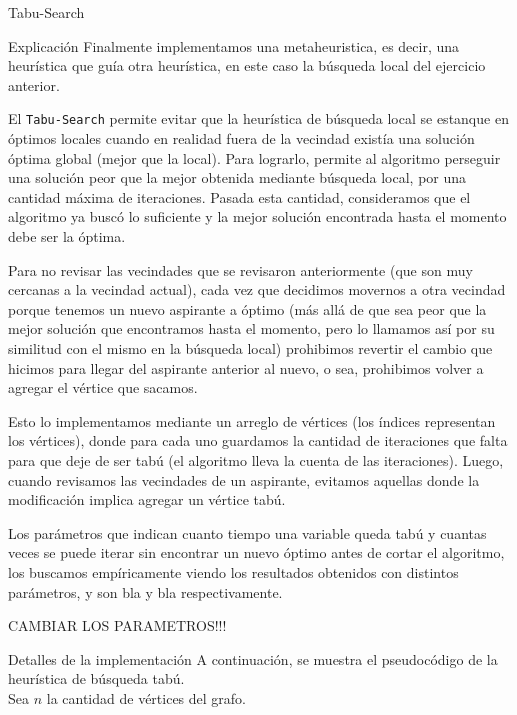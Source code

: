 \begin{section}{Tabu-Search}
	\begin{subsection}{Explicación}
		Finalmente implementamos una metaheuristica, es decir, una heurística que guía otra heurística, en este caso la búsqueda local del ejercicio anterior.

		El \texttt{Tabu-Search} permite evitar que la heurística de búsqueda local se estanque en óptimos locales cuando en realidad fuera de la vecindad existía una solución óptima global (mejor que la local).
		Para lograrlo, permite al algoritmo perseguir una solución peor que la mejor obtenida mediante búsqueda local, por una cantidad máxima de iteraciones.
		Pasada esta cantidad, consideramos que el algoritmo ya buscó lo suficiente y la mejor solución encontrada hasta el momento debe ser la óptima.

		Para no revisar las vecindades que se revisaron anteriormente (que son muy cercanas a la vecindad actual),
		cada vez que decidimos movernos a otra vecindad porque tenemos un nuevo aspirante a óptimo (más allá de que sea peor que la mejor solución que encontramos hasta el momento, pero lo llamamos así por su similitud con el mismo en la búsqueda local)
		prohibimos revertir el cambio que hicimos para llegar del aspirante anterior al nuevo, o sea, prohibimos volver a agregar el vértice que sacamos.

		Esto lo implementamos mediante un arreglo de vértices (los índices representan los vértices), donde para cada uno guardamos la cantidad de iteraciones que falta para que deje de ser tabú (el algoritmo lleva la cuenta de las iteraciones).
		Luego, cuando revisamos las vecindades de un aspirante, evitamos aquellas donde la modificación implica agregar un vértice tabú.

		Los parámetros que indican cuanto tiempo una variable queda tabú y cuantas veces se puede iterar sin encontrar un nuevo óptimo antes de cortar el algoritmo, los buscamos empíricamente viendo los resultados obtenidos con distintos parámetros, y son bla y bla respectivamente.

		CAMBIAR LOS PARAMETROS!!!
	\end{subsection}
	\begin{subsection}{Detalles de la implementación}
		A continuación, se muestra el pseudocódigo de la heurística de búsqueda tabú.\\

		Sea $n$ la cantidad de vértices del grafo.


\end{subsection}
\end{section}
